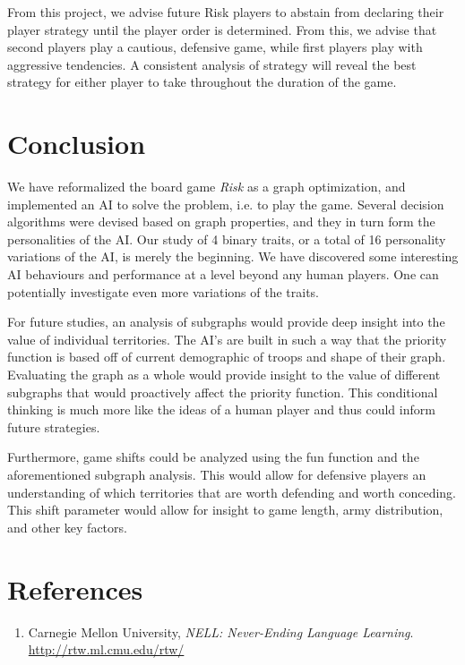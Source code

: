 \documentclass[12pt]{article}  %
\begin{document}
From this project, we advise future Risk players to abstain from declaring their player strategy until the player order is determined. From this, we advise that second players play a cautious, defensive game, while first players play with aggressive tendencies. A consistent analysis of strategy will reveal the best strategy for either player to take throughout the duration of the game. 



\section{Conclusion}
We have reformalized the board game \emph{Risk} as a graph optimization, and implemented an AI to solve the problem, i.e. to play the game. Several decision algorithms were devised based on graph properties, and they in turn form the personalities of the AI. Our study of 4 binary traits, or a total of 16 personality variations of the AI, is merely the beginning. We have discovered some interesting AI behaviours and performance at a level beyond any human players. One can potentially investigate even more variations of the traits.

For future studies, an analysis of subgraphs would provide deep insight into the value of individual territories. The AI’s are built in such a way that the priority function is based off of current demographic of troops and shape of their graph. Evaluating the graph as a whole would provide insight to the value of different subgraphs that would proactively affect the priority function. This conditional thinking is much more like the ideas of a human player and thus could inform future strategies. 

Furthermore, game shifts could be analyzed using the fun function and the aforementioned subgraph analysis. This would allow for defensive players an understanding of which territories that are worth defending and worth conceding. This shift parameter would allow for insight to game length, army distribution, and other key factors.  





\section{References}


\begin{enumerate}

\item Carnegie Mellon University, \emph{NELL: Never-Ending Language Learning}. \url{http://rtw.ml.cmu.edu/rtw/}\label{NELL}
\end{enumerate}
\end{document}

